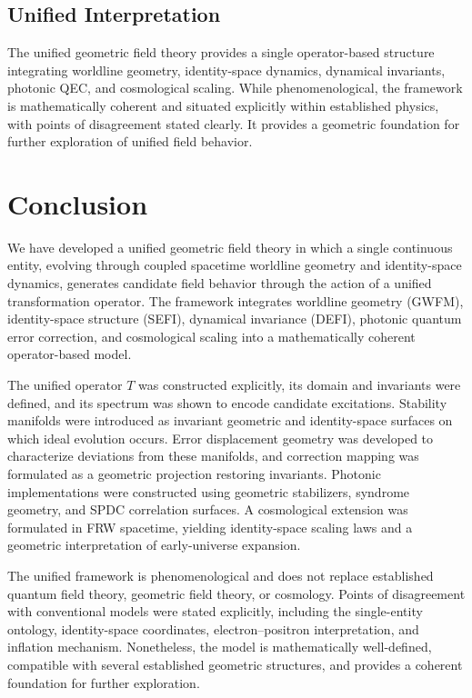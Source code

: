 \documentclass[aip,jmp,reprint,onecolumn,nofootinbib]{revtex4-2}
\begin{document}
\subsection{Unified Interpretation}

The unified geometric field theory provides a single operator-based structure integrating 
worldline geometry, identity-space dynamics, dynamical invariants, photonic QEC, and 
cosmological scaling. While phenomenological, the framework is mathematically coherent 
and situated explicitly within established physics, with points of disagreement stated 
clearly. It provides a geometric foundation for further exploration of unified field behavior.

\section{Conclusion}

We have developed a unified geometric field theory in which a single continuous entity, 
evolving through coupled spacetime worldline geometry and identity-space dynamics, 
generates candidate field behavior through the action of a unified transformation operator. 
The framework integrates worldline geometry (GWFM), identity-space structure (SEFI), 
dynamical invariance (DEFI), photonic quantum error correction, and cosmological scaling 
into a mathematically coherent operator-based model.

The unified operator $T$ was constructed explicitly, its domain and invariants were defined, 
and its spectrum was shown to encode candidate excitations. Stability manifolds were 
introduced as invariant geometric and identity-space surfaces on which ideal evolution 
occurs. Error displacement geometry was developed to characterize deviations from these 
manifolds, and correction mapping was formulated as a geometric projection restoring 
invariants. Photonic implementations were constructed using geometric stabilizers, syndrome 
geometry, and SPDC correlation surfaces. A cosmological extension was formulated in FRW 
spacetime, yielding identity-space scaling laws and a geometric interpretation of early-universe 
expansion.

The unified framework is phenomenological and does not replace established quantum field 
theory, geometric field theory, or cosmology. Points of disagreement with conventional 
models were stated explicitly, including the single-entity ontology, identity-space coordinates, 
electron–positron interpretation, and inflation mechanism. Nonetheless, the model is 
mathematically well-defined, compatible with several established geometric structures, and 
provides a coherent foundation for further exploration.
\end{document}
